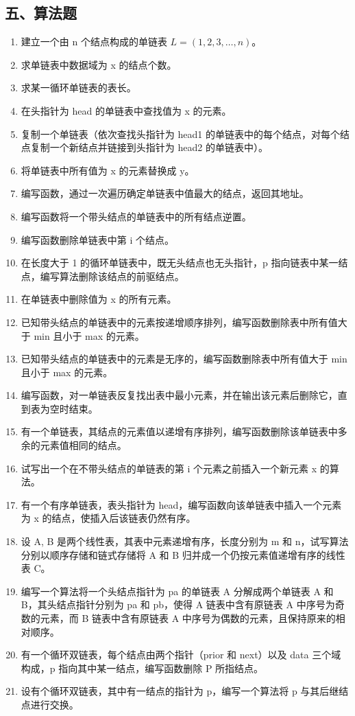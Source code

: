 \documentclass[12pt, a4paper]{article}
\begin{document}
\subsection*{五、算法题}
\begin{enumerate}
    \item 建立一个由 n 个结点构成的单链表 $L=(1, 2, 3, \dots, n)$。
    \item 求单链表中数据域为 x 的结点个数。
    \item 求某一循环单链表的表长。
    \item 在头指针为 head 的单链表中查找值为 x 的元素。
    \item 复制一个单链表（依次查找头指针为 head1 的单链表中的每个结点，对每个结点复制一个新结点并链接到头指针为 head2 的单链表中）。
    \item 将单链表中所有值为 x 的元素替换成 y。
    \item 编写函数，通过一次遍历确定单链表中值最大的结点，返回其地址。
    \item 编写函数将一个带头结点的单链表中的所有结点逆置。
    \item 编写函数删除单链表中第 i 个结点。
    \item 在长度大于 1 的循环单链表中，既无头结点也无头指针，p 指向链表中某一结点，编写算法删除该结点的前驱结点。
    \item 在单链表中删除值为 x 的所有元素。
    \item 已知带头结点的单链表中的元素按递增顺序排列，编写函数删除表中所有值大于 min 且小于 max 的元素。
    \item 已知带头结点的单链表中的元素是无序的，编写函数删除表中所有值大于 min 且小于 max 的元素。
    \item 编写函数，对一单链表反复找出表中最小元素，并在输出该元素后删除它，直到表为空时结束。
    \item 有一个单链表，其结点的元素值以递增有序排列，编写函数删除该单链表中多余的元素值相同的结点。
    \item 试写出一个在不带头结点的单链表的第 i 个元素之前插入一个新元素 x 的算法。
    \item 有一个有序单链表，表头指针为 head，编写函数向该单链表中插入一个元素为 x 的结点，使插入后该链表仍然有序。
    \item 设 A, B 是两个线性表，其表中元素递增有序，长度分别为 m 和 n，试写算法分别以顺序存储和链式存储将 A 和 B 归并成一个仍按元素值递增有序的线性表 C。
    \item 编写一个算法将一个头结点指针为 pa 的单链表 A 分解成两个单链表 A 和 B，其头结点指针分别为 pa 和 pb，使得 A 链表中含有原链表 A 中序号为奇数的元素，而 B 链表中含有原链表 A 中序号为偶数的元素，且保持原来的相对顺序。
    \item 有一个循环双链表，每个结点由两个指针（prior 和 next）以及 data 三个域构成，p 指向其中某一结点，编写函数删除 P 所指结点。
    \item 设有个循环双链表，其中有一结点的指针为 p，编写一个算法将 p 与其后继结点进行交换。
\end{enumerate}
\end{document}
